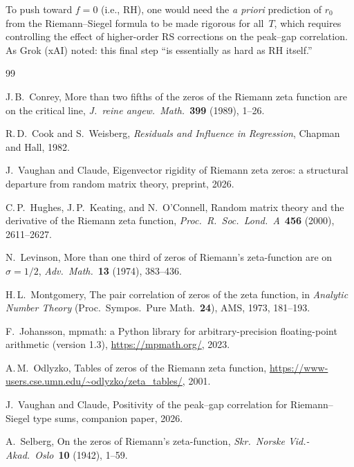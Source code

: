 \documentclass[11pt,a4paper]{article}
\begin{document}
To push toward $f = 0$ (i.e., RH), one would need the \emph{a priori} prediction
of $r_0$ from the Riemann--Siegel formula to be made rigorous for all~$T$,
which requires controlling the effect of higher-order RS corrections
on the peak--gap correlation.
As Grok (xAI) noted: this final step ``is essentially as hard as RH itself.''


\begin{thebibliography}{99}

J.\,B.~Conrey,
More than two fifths of the zeros of the Riemann zeta function are on the critical line,
\emph{J.~reine angew.~Math.}\ \textbf{399} (1989), 1--26.

R.\,D.~Cook and S.~Weisberg,
\emph{Residuals and Influence in Regression},
Chapman and Hall, 1982.

J.~Vaughan and Claude,
Eigenvector rigidity of Riemann zeta zeros: a structural departure from random matrix theory,
preprint, 2026.

C.\,P.~Hughes, J.\,P.~Keating, and N.~O'Connell,
Random matrix theory and the derivative of the Riemann zeta function,
\emph{Proc.\ R.\ Soc.\ Lond.\ A}\ \textbf{456} (2000), 2611--2627.

N.~Levinson,
More than one third of zeros of Riemann's zeta-function are on $\sigma = 1/2$,
\emph{Adv.\ Math.}\ \textbf{13} (1974), 383--436.

H.\,L.~Montgomery,
The pair correlation of zeros of the zeta function,
in \emph{Analytic Number Theory} (Proc.\ Sympos.\ Pure Math.\ \textbf{24}), AMS, 1973, 181--193.

F.~Johansson,
mpmath: a Python library for arbitrary-precision floating-point arithmetic (version 1.3),
\url{https://mpmath.org/}, 2023.

A.\,M.~Odlyzko,
Tables of zeros of the Riemann zeta function,
\url{https://www-users.cse.umn.edu/~odlyzko/zeta_tables/}, 2001.

J.~Vaughan and Claude,
Positivity of the peak--gap correlation for Riemann--Siegel type sums,
companion paper, 2026.

A.~Selberg,
On the zeros of Riemann's zeta-function,
\emph{Skr.\ Norske Vid.-Akad.\ Oslo}\ \textbf{10} (1942), 1--59.

\end{thebibliography}
\end{document}
